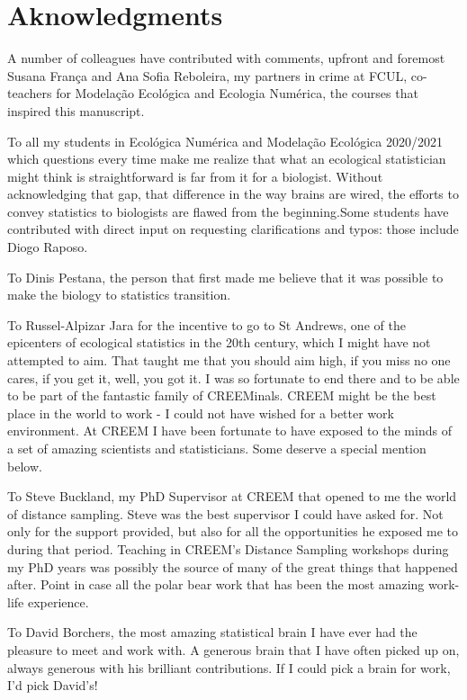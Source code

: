\documentclass[
]{book}
\begin{document}
\hypertarget{aknowledgments}{%
\chapter{Aknowledgments}\label{aknowledgments}}

A number of colleagues have contributed with comments, upfront and foremost Susana França and Ana Sofia Reboleira, my partners in crime at FCUL, co-teachers for Modelação Ecológica and Ecologia Numérica, the courses that inspired this manuscript.

To all my students in Ecológica Numérica and Modelação Ecológica 2020/2021 which questions every time make me realize that what an ecological statistician might think is straightforward is far from it for a biologist. Without acknowledging that gap, that difference in the way brains are wired, the efforts to convey statistics to biologists are flawed from the beginning.Some students have contributed with direct input on requesting clarifications and typos: those include Diogo Raposo.

To Dinis Pestana, the person that first made me believe that it was possible to make the biology to statistics transition.

To Russel-Alpizar Jara for the incentive to go to St Andrews, one of the epicenters of ecological statistics in the 20th century, which I might have not attempted to aim. That taught me that you should aim high, if you miss no one cares, if you get it, well, you got it. I was so fortunate to end there and to be able to be part of the fantastic family of CREEMinals. CREEM might be the best place in the world to work - I could not have wished for a better work environment. At CREEM I have been fortunate to have exposed to the minds of a set of amazing scientists and statisticians. Some deserve a special mention below.

To Steve Buckland, my PhD Supervisor at CREEM that opened to me the world of distance sampling. Steve was the best supervisor I could have asked for. Not only for the support provided, but also for all the opportunities he exposed me to during that period. Teaching in CREEM's Distance Sampling workshops during my PhD years was possibly the source of many of the great things that happened after. Point in case all the polar bear work that has been the most amazing work-life experience.

To David Borchers, the most amazing statistical brain I have ever had the pleasure to meet and work with. A generous brain that I have often picked up on, always generous with his brilliant contributions. If I could pick a brain for work, I'd pick David's!
\end{document}
